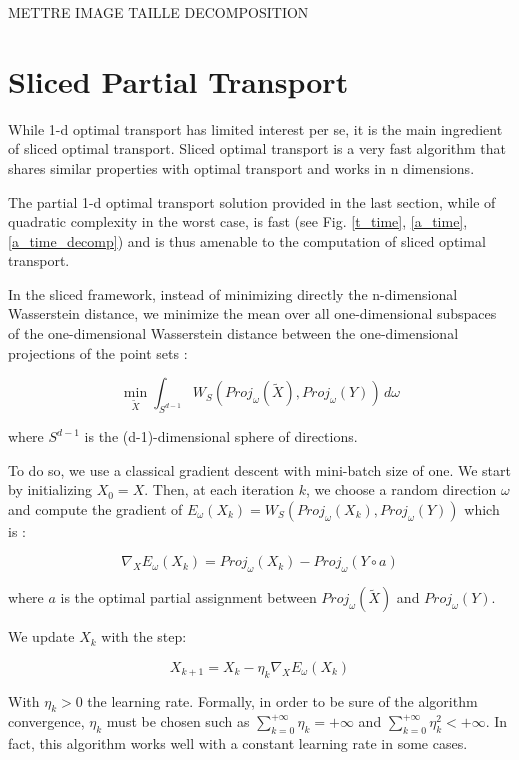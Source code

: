 \documentclass[a4paper,12pt]{article}
\begin{document}
METTRE IMAGE TAILLE DECOMPOSITION


\section{Sliced Partial Transport}

While 1-d optimal transport has limited interest per se, it is the main ingredient of sliced optimal transport. Sliced optimal transport is a very fast algorithm that shares similar properties with optimal transport and works in n dimensions.

The partial 1-d optimal transport solution provided in the last section, while of quadratic complexity in the worst case, is fast (see Fig. \ref{t_time}, \ref{a_time}, \ref{a_time_decomp}) and is thus amenable to the computation of sliced optimal transport.

In the sliced framework, instead of minimizing directly the n-dimensional Wasserstein distance, we minimize the mean over all one-dimensional subspaces of the one-dimensional Wasserstein distance between the one-dimensional projections of the point sets :

\begin{equation}
\min_{\tilde{X}} \int_{S^{d-1}} W_S(Proj_\omega(\tilde{X}),Proj_\omega(Y))\,d\omega
\end{equation}

\noindent where $S^{d−1}$ is the (d-1)-dimensional sphere of directions.

To do so, we use a classical gradient descent with mini-batch size of one. We start by initializing $X_0 = X$. Then, at each iteration $k$, we choose a random direction $\omega$ and compute the gradient of $E_\omega(X_k) = W_S(Proj_\omega(X_k),Proj_\omega(Y))$ which is :

\begin{equation}
\nabla_{X}  E_\omega(X_k) = Proj_\omega(X_k)-Proj_\omega(Y \circ a)
\end{equation}

\noindent where $a$ is the optimal partial assignment between $Proj_\omega(\tilde{X})$ and $Proj_\omega(Y)$. 

We update $X_k$ with the step:

$$
X_{k+1} = X_k - \eta_k \nabla_{X}  E_\omega(X_k)
$$

\noindent With $\eta_k>0$ the learning rate. Formally, in order to be sure of the algorithm convergence, $\eta_k$ must be chosen such as $\sum_{k=0}^{+\infty} \eta_k = +\infty$ and $\sum_{k=0}^{+\infty} \eta_k^2 < +\infty$. In fact, this algorithm works well with a constant learning rate in some cases.
\end{document}
